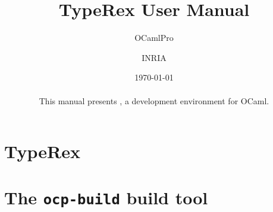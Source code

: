\documentclass[12pt]{book}
\title{TypeRex User Manual}
\author{OCamlPro \and INRIA}
\date{\today{}\\
~\\
This manual presents \typerex, a development
environment for OCaml.
}
\begin{document}
\newcommand{\typerex}{TypeRex}
\newcommand{\cmd}[1]{$\texttt{#1}$}

\newcommand{\verbsize}{%BEGIN LATEX
\footnotesize%
}

\maketitle
%
\thispagestyle{empty}
\tableofcontents


\chapter{TypeRex}



\chapter{The {\tt ocp-build} build tool}


\end{document}
